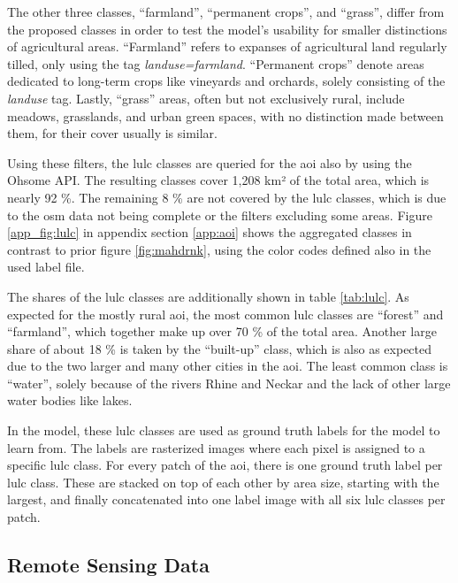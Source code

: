 The other three classes, \enquote{farmland}, \enquote{permanent crops}, and \enquote{grass}, differ from the proposed classes in order to test the model's usability for smaller distinctions of agricultural areas. \enquote{Farmland} refers to expanses of agricultural land regularly tilled, only using the tag \emph{landuse=farmland}. \enquote{Permanent crops} denote areas dedicated to long-term crops like vineyards and orchards, solely consisting of the \emph{landuse} tag. Lastly, \enquote{grass} areas, often but not exclusively rural, include meadows, grasslands, and urban green spaces, with no distinction made between them, for their cover usually is similar.

Using these filters, the \gls{lulc} classes are queried for the \gls{aoi} also by using the Ohsome API. The resulting classes cover 1,208 km² of the total area, which is nearly 92 \%. The remaining 8 \% are not covered by the \gls{lulc} classes, which is due to the \gls{osm} data not being complete or the filters excluding some areas. Figure \ref{app_fig:lulc} in appendix section \ref{app:aoi} shows the aggregated classes in contrast to prior figure \ref{fig:mahdrnk}, using the color codes defined also in the used label file.

The shares of the \gls{lulc} classes are additionally shown in table \ref{tab:lulc}. As expected for the mostly rural \gls{aoi}, the most common \gls{lulc} classes are \enquote{forest} and \enquote{farmland}, which together make up over 70 \% of the total area. Another large share of about 18 \% is taken by the \enquote{built-up} class, which is also as expected due to the two larger and many other cities in the \gls{aoi}. The least common class is \enquote{water}, solely because of the rivers Rhine and Neckar and the lack of other large water bodies like lakes.

In the model, these \gls{lulc} classes are used as ground truth labels for the model to learn from. The labels are rasterized images where each pixel is assigned to a specific \gls{lulc} class. For every patch of the \gls{aoi}, there is one ground truth label per \gls{lulc} class. These are stacked on top of each other by area size, starting with the largest, and finally concatenated into one label image with all six \gls{lulc} classes per patch.

\subsection{Remote Sensing Data}
\label{subsec:inputdata}

